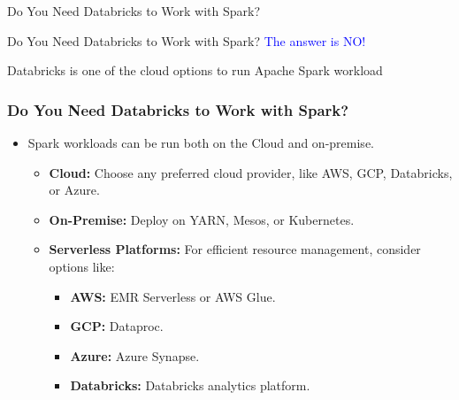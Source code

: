 \begin{frame}
    \centering
    \vfill
    \Large{Do You Need Databricks to Work with Spark?} %
    \vspace{1em} %
    \vfill
\end{frame}

\begin{frame}
    \centering
    \vfill
    \Large{Do You Need Databricks to Work with Spark?} %
    \hspace{1cm} %
    \Large{\textcolor{blue}{The answer is NO!}} %
    \vfill
\end{frame}
\begin{frame}
    \centering
    \vfill
    \Large{Databricks is one of the cloud options to run Apache Spark workload} %
    \hspace{1cm} %
    \vfill
\end{frame}
\begin{frame}
    \frametitle{Do You Need Databricks to Work with Spark?}

    \begin{itemize}
        \item Spark workloads can be run both on the Cloud and on-premise.
        \begin{itemize}
            \item \textbf{Cloud:} Choose any preferred cloud provider, like AWS, GCP, Databricks, or Azure.
            \item \textbf{On-Premise:} Deploy on YARN, Mesos, or Kubernetes.
            \item \textbf{Serverless Platforms:} For efficient resource management, consider options like:
            \begin{itemize}
                \item \textbf{AWS:} EMR Serverless or AWS Glue.
                \item \textbf{GCP:} Dataproc.
                \item \textbf{Azure:} Azure Synapse.
                \item \textbf{Databricks:} Databricks analytics platform.
            \end{itemize}
        \end{itemize}
    \end{itemize}
\end{frame}

